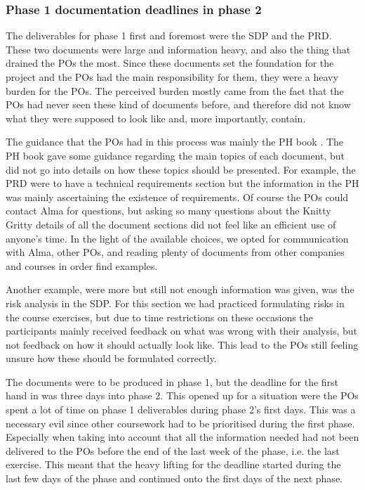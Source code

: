\documentclass{article}
\begin{document}
\subsubsection{Phase 1 documentation deadlines in phase 2}
The deliverables for phase 1 first and foremost were the SDP and the PRD. These two documents were large and information heavy, and also the thing that drained the POs the most. Since these documents set the foundation for the project and the POs had the main responsibility for them, they were a heavy burden for the POs. The perceived burden mostly came from the fact that the POs had never seen these kind of documents before, and therefore did not know what they were supposed to look like and, more importantly, contain. 

The guidance that the POs had in this process was mainly the PH book \cite{PH}. The PH book gave some guidance regarding the main topics of each document, but did not go into details on how these topics should be presented. For example, the PRD were to have a technical requirements section but the information in the PH was mainly ascertaining the existence of requirements. Of course the POs could contact Alma for questions, but asking so many questions about the Knitty Gritty details of all the document sections did not feel like an efficient use of anyone's time. In the light of the available choices, we opted for communication with Alma, other POs, and reading plenty of documents from other companies and courses in order find examples.

Another example, were more but still not enough information was given, was the risk analysis in the SDP. For this section we had practiced formulating risks in the course exercises, but due to time restrictions on these occasions the participants mainly received feedback on what was wrong with their analysis, but not feedback on how it should actually look like. This lead to the POs still feeling unsure how these should be formulated correctly.

The documents were to be produced in phase 1, but the deadline for the first hand in was three days into phase 2. This opened up for a situation were the POs spent a lot of time on phase 1 deliverables during phase 2's first days. This was a necessary evil since other coursework had to be prioritised during the first phase. Especially when taking into account that all the information needed had not been delivered to the POs before the end of the last week of the phase, i.e. the last exercise. This meant that the heavy lifting for the deadline started during the last few days of the phase and continued onto the first days of the next phase. 
\end{document}
